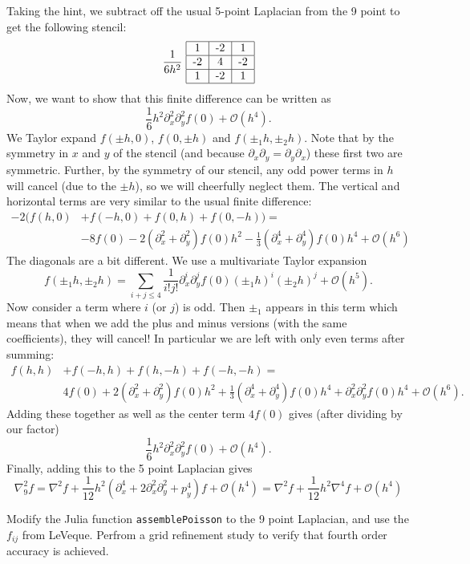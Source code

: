 \documentclass[12pt]{article}
\def\O{\mathcal O}
\let\p\partial
\begin{document}
\begin{problems}
Taking the hint, we subtract off the usual 5-point Laplacian from the 9 point to get the 
following stencil: 
$$\frac1{6h^2} ~ \begin{tabular}{| c | c | c |}
    \hline
    1 & -2 & 1\\
    \hline
    -2 & 4 & -2\\ 
    \hline
    1 & -2 & 1\\
    \hline
\end{tabular}$$
Now, we want to show that this finite difference can be written as 
$$\frac16 h^2 \partial_x^2 \partial_y^2 f(0) + \O(h^4).$$
We Taylor expand $f(\pm h, 0)$, $f(0, \pm h)$ and $f(\pm_1 h, \pm_2 h)$. Note that 
by the symmetry in $x$ and $y$ of the stencil (and because $\p_x \p_y = \p_y \p_x$)
these first two are symmetric. Further, by the symmetry of our stencil, any odd power terms 
in $h$ will cancel (due to the $\pm h$), so we will cheerfully neglect them.
The vertical and horizontal terms are very similar to the usual finite difference:
\begin{align*}
    -2(f(h,0) &+ f(-h,0) + f(0 ,h) + f(0,-h)) =\\
              &-8 f(0) - 2(\p_x^2 +\p_y^2) f(0) h^2 - \frac13(\p_x^4 + \p_y^4)f(0)h^4 
              + \O(h^6)
\end{align*}
The diagonals are a bit different. We use a multivariate Taylor expansion 
$$f(\pm_1 h, \pm_2 h) = \sum_{i+j\leq 4} \frac1{i!j!} \p_x^i\p_y^j f(0) (\pm_1 h)^i
    (\pm_2 h)^j + \O(h^5).$$
Now consider a term where $i$ (or $j$) is odd. Then $\pm_1$ appears in this term which 
means that when we add the plus and minus versions (with the same coefficients), they will 
cancel! In particular we are left with only even terms after summing: 
\begin{align*}
    f(h,h) &+ f(-h,h) + f(h ,-h) + f(-h,-h) =\\
           &4 f(0) + 2(\p_x^2 + \p_y^2) f(0)h^2 + \frac13(\p_x^4 + \p_y^4)f(0)h^4 + 
\p_x^2\p_y^2 f(0) h^4 + \O(h^6).
\end{align*}
Adding these together as well as the center term $4 f(0)$ gives (after dividing by 
our factor)
$$\frac16 h^2 \p_x^2\p_y^2 f(0) + \O(h^4).$$
Finally, adding this to the 5 point Laplacian gives  
$$\nabla^2_9 f = \nabla^2 f + \frac1{12} h^2 (\p_x^4 + 2\p_x^2\p_y^2 + p_y^4) f + \O(h^4)
 = \nabla^2 f + \frac1{12} h^2 \nabla^4 f + \O(h^4)
$$

\newpage 

\problemitem[1b)] Modify the Julia function \verb$assemblePoisson$ to the 
    9 point Laplacian, and use the $f_{ij}$ from LeVeque. Perfrom a grid refinement study 
    to verify that fourth order accuracy is achieved.


\end{problems}
\end{document}
